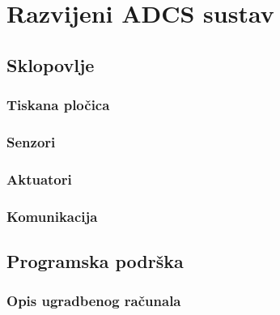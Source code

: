 \documentclass[times, utf8, diplomski, numeric]{templates/template}
\begin{document}
\chapter{Razvijeni ADCS sustav}{
    \section{Sklopovlje}{
        \subsection{Tiskana pločica}{
            \iffalse
            - ukratko o razvijenoj plocici
            - staviti kakvu shemu
            \fi
        }

        \subsection{Senzori}{
            \iffalse
            - zasto koristimo IMU
            - napisati da akcelerometar ne moze raditi u svemiru
            - mane ziroskopa
                - bias
            - mane akcelerometra
                - sum
            - magnetometar
                - model magnetskog polja zemlje
                    - mijenja se s vremenom
            \fi
        }

        \subsection{Aktuatori}{
        \iffalse
        - zasto koristimo bas (stavi ime) aktuator 
            - a ne magnetorqer npr
            - za magnetorqer navesti referencu na izracun parametara koji je radio Ivan Indir
            - navesti karlin rad, pitaj ju sto je ona radila pa ju citiraj
        \fi
        }

        \subsection{Komunikacija}{
            \iffalse
            - zasto koristimo bluetooth komunikaciju
            - navest ime modula
            - kako radi modul
            - kako komuniciramo s njime
            \fi
        }
    }
    
    \section{Programska podrška}{
        \subsection{Opis ugradbenog računala}{
            \iffalse
            - koje ugradbeno racunalo koristimo
            - zasto smo bas to odabrali
            \fi
        }

}}
\end{document}
